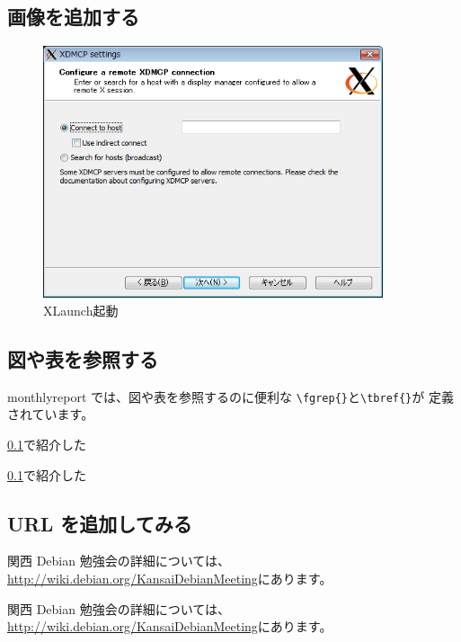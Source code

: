 \documentclass[mingoth,a4paper]{jsarticle}
\begin{document}
\begin{commandline}
\begin{commandline}
\subsection{画像を追加する}
\label{sec:addpicture}

\begin{figure}[htbp]
 \begin{center}
  \includegraphics[width=100mm]{image200808/colinux_xlaunch_xdmcp.png}
 \end{center}
 \caption{XLaunch起動}
 \label{fig:olinux_xlaunch_xdmcp}
\end{figure}
\end{commandline}

\subsection{図や表を参照する}

monthlyreport では、図や表を参照するのに便利な
\verb|\fgrep{}|と\verb|\tbref{}|が
定義されています。

\ref{sec:addpicture}で紹介した

\begin{commandline}
\ref{sec:addpicture}で紹介した
\end{commandline}

\subsection{URL を追加してみる}

関西 Debian 勉強会の詳細については、\url{http://wiki.debian.org/KansaiDebianMeeting}にあります。

\begin{commandline}
関西 Debian 勉強会の詳細については、\url{http://wiki.debian.org/KansaiDebianMeeting}にあります。
\end{commandline}


\end{commandline}
\end{document}

